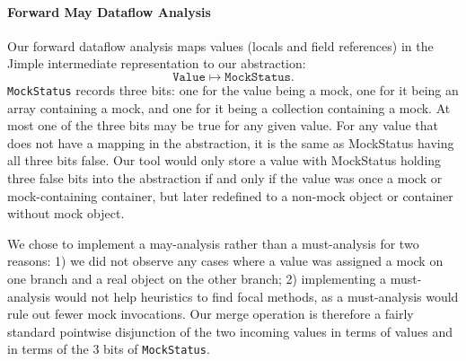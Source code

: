 



\paragraph{Forward May Dataflow Analysis}
\label{subsubsec:forward}

Our forward dataflow analysis maps values (locals and field references) in the Jimple intermediate representation to our abstraction:
\[ \mathtt{Value} \mapsto \mathtt{MockStatus}. \]
\texttt{MockStatus} records three bits: one for the value being a mock, one for it being an array containing a mock, and one for it being a collection containing a mock. At most one of the three bits may be true for any given value. For any value that does not have a mapping in the abstraction, it is the same as MockStatus having all three bits false. Our tool would only store a value with MockStatus holding three false bits into the abstraction if and only if the value was once a mock or mock-containing container, but later redefined to a non-mock object or container without mock object.

We chose to implement a may-analysis rather than a must-analysis for two reasons: 1) we did not observe any cases where a value was assigned a mock on one branch and a real object on the other branch; 2) implementing a must-analysis would not help heuristics to find focal methods, as a must-analysis would rule out fewer mock invocations. Our merge operation is therefore a fairly standard pointwise disjunction of the two incoming values in terms of values and in terms of the 3 bits of \texttt{MockStatus}.

